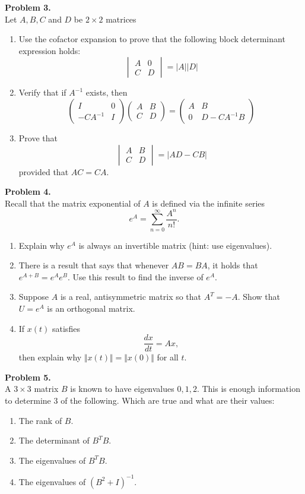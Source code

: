\documentclass[11pt]{article}
\begin{document}
\noindent \textbf{Problem 3.}\\
Let $A,B,C$ and $D$ be $2\times 2$ matrices
\begin{enumerate}
\item Use the cofactor expansion to prove that the following block determinant expression holds:
$$\begin{vmatrix} A & 0 \\ C & D \end{vmatrix} = \vert A \vert \vert D \vert$$
\item Verify that if $A^{-1}$ exists, then
$$\begin{pmatrix} I & 0 \\ -CA^{-1} & I \end{pmatrix} \begin{pmatrix} A & B \\ C & D \end{pmatrix}  = \begin{pmatrix} A & B \\ 0 & D-CA^{-1} B\end{pmatrix} $$
\item Prove that
$$ \begin{vmatrix} A & B \\ C & D \end{vmatrix} = \vert AD - C B \vert $$
provided that $AC=CA$. 
\end{enumerate}

\newpage

\noindent \textbf{Problem 4.}\\
Recall that the matrix exponential of $A$ is defined via the infinite series
$$e^A = \sum_{n=0}^{\infty} \frac{A^n}{n!}.$$
\begin{enumerate}
\item Explain why $e^A$ is always an invertible matrix (hint: use eigenvalues). 
\item There is a result that says that whenever $AB=BA$, it holds that $e^{A+B}=e^{A}e^{B}$. Use this result to find the inverse of $e^{A}$. 
\item Suppose $A$ is a real, antisymmetric matrix so that $A^T=-A$. Show that $U= e^A$ is an orthogonal matrix.
\item If $x(t)$ satisfies 
$$\frac{dx}{dt} = Ax,$$
then explain why $\Vert x(t) \Vert = \Vert x(0) \Vert$ for all $t$.
\end{enumerate}

\vskip 200pt 

\noindent \textbf{Problem 5.}\\
A $3\times 3$ matrix $B$ is known to have eigenvalues $0,1,2$. This is enough information to determine 3 of the following. Which are true and what are their values:
\begin{enumerate}
\item The rank of $B$.
\item The determinant of $B^TB$.
\item The eigenvalues of $B^TB$.
\item The eigenvalues of $(B^2+I)^{-1}$. 
\end{enumerate}
\end{document}
